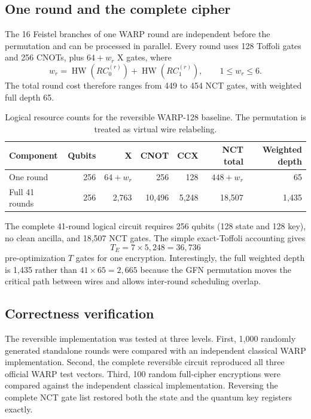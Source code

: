 \documentclass[pdflatex,sn-nature]{sn-jnl}
\newcommand{\HW}{\operatorname{HW}}
\theoremstyle{thmstyleone}
\theoremstyle{thmstyletwo}
\begin{document}
\subsection{One round and the complete cipher}
The 16 Feistel branches of one WARP round are independent before the permutation and can be processed in parallel. Every round uses 128 Toffoli gates and 256 CNOTs, plus $64+w_r$ X gates, where
\begin{equation}
    w_r = \HW(RC_0^{(r)})+\HW(RC_1^{(r)}), \qquad 1\le w_r\le 6.
\end{equation}
The total round cost therefore ranges from 449 to 454 NCT gates, with weighted full depth 65.

\begin{table}[t]
\centering
\caption{Logical resource counts for the reversible WARP-128 baseline. The permutation is treated as virtual wire relabeling.}
\label{tab:warp_resources}
\begin{tabular}{lrrrrrr}
\toprule
Component & Qubits & X & CNOT & CCX & NCT total & Weighted depth\\
\midrule
One round & 256 & $64+w_r$ & 256 & 128 & $448+w_r$ & 65\\
Full 41 rounds & 256 & 2,763 & 10,496 & 5,248 & 18,507 & 1,435\\
\bottomrule
\end{tabular}
\end{table}

The complete 41-round logical circuit requires 256 qubits (128 state and 128 key), no clean ancilla, and 18,507 NCT gates. The simple exact-Toffoli accounting gives
\begin{equation}
    T_E = 7\times 5{,}248 = 36{,}736
\end{equation}
pre-optimization $T$ gates for one encryption. Interestingly, the full weighted depth is 1,435 rather than $41\times65=2,665$ because the GFN permutation moves the critical path between wires and allows inter-round scheduling overlap.

\subsection{Correctness verification}
The reversible implementation was tested at three levels. First, 1,000 randomly generated standalone rounds were compared with an independent classical WARP implementation. Second, the complete reversible circuit reproduced all three official WARP test vectors. Third, 100 random full-cipher encryptions were compared against the independent classical implementation. Reversing the complete NCT gate list restored both the state and the quantum key registers exactly.
\end{document}
